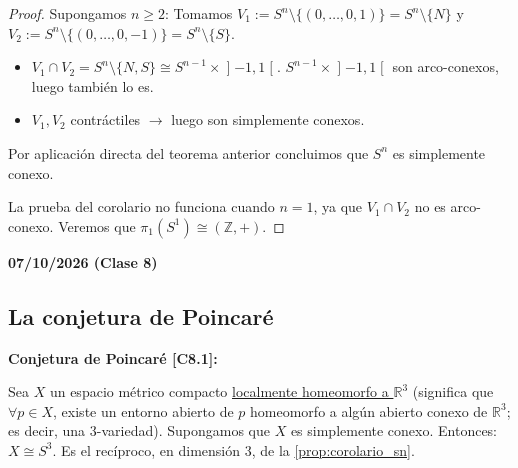 \begin{proof}
Supongamos $n \ge 2$:
Tomamos $V_1 := S^n \setminus \{(0, \dots, 0, 1)\} = S^n \setminus \{N\}$ y $V_2 := S^n \setminus \{(0, \dots, 0, -1)\} = S^n \setminus \{S\}$.
\begin{itemize}
\item $V_1 \cap V_2 = S^n \setminus \{N, S\} \cong S^{n-1} \times \mathopen]-1, 1\mathclose[$. $S^{n-1} \times \mathopen]-1, 1\mathclose[$ son arco-conexos, luego también lo es.
\item $V_1, V_2$ contráctiles $\longrightarrow$ luego son simplemente conexos.
\end{itemize}
Por aplicación directa del teorema anterior concluimos que $S^n$ es simplemente conexo.

\begin{center}
\end{center}

La prueba del corolario no funciona cuando $n=1$, ya que $V_1 \cap V_2$ no es arco-conexo. Veremos que $\pi_1(S^1) \cong (\mathbb{Z}, +)$.
\end{proof}

\begin{center}
    \textbf{07/10/2026 (Clase 8)}
\end{center}

\subsection{La conjetura de Poincaré}

\textbf{Conjetura de Poincaré [C8.1]:}

Sea $X$ un espacio métrico compacto \underline{localmente homeomorfo a $\mathbb{R}^3$} (significa que $\forall p \in X$, existe un entorno abierto de $p$ homeomorfo a algún abierto conexo de $\mathbb{R}^3$; es decir, una 3-variedad).
Supongamos que $X$ es simplemente conexo. Entonces: $X \cong S^3$. Es el recíproco, en dimensión 3, de la \cref{prop:corolario_sn}.

